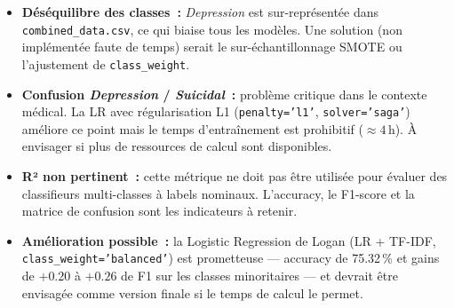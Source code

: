\documentclass[12pt,a4paper]{article}
\begin{document}
\begin{itemize}
  \item \textbf{Déséquilibre des classes~:} \textit{Depression} est sur-représentée dans \\
  \texttt{combined\_data.csv}, ce qui biaise tous les modèles. Une solution (non implémentée faute de temps) serait le sur-échantillonnage SMOTE ou l'ajustement de \texttt{class\_weight}.

  \item \textbf{Confusion \textit{Depression} / \textit{Suicidal}~:} problème critique dans le contexte médical. La LR avec régularisation L1 (\texttt{penalty='l1'}, \texttt{solver='saga'}) améliore ce point mais le temps d'entraînement est prohibitif ($\approx 4$\,h). À envisager si plus de ressources de calcul sont disponibles.

  \item \textbf{R² non pertinent~:} cette métrique ne doit pas être utilisée pour évaluer des classifieurs multi-classes à labels nominaux. L'accuracy, le F1-score et la matrice de confusion sont les indicateurs à retenir.

  \item \textbf{Amélioration possible~:} la Logistic Regression de Logan (LR + TF-IDF, \\
  \texttt{class\_weight='balanced'}) est prometteuse --- accuracy de 75.32\,\% et gains de $+0.20$ à $+0.26$ de F1 sur les classes minoritaires --- et devrait être envisagée comme version finale si le temps de calcul le permet.
\end{itemize}
\end{document}
